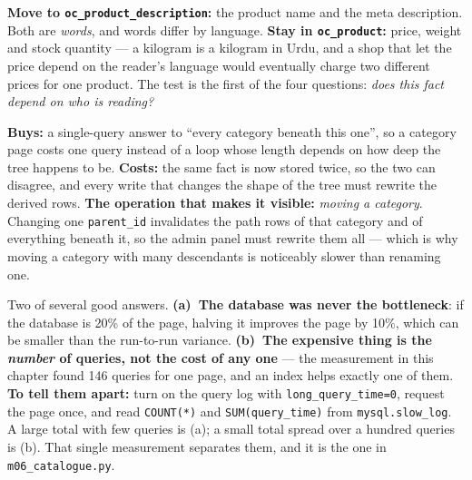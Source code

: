 \begin{ans}
  \item \textbf{Move to \texttt{oc\_product\_description}:} the product name
        and the meta description. Both are \emph{words}, and words differ by
        language. \textbf{Stay in \texttt{oc\_product}:} price, weight and
        stock quantity --- a kilogram is a kilogram in Urdu, and a shop that
        let the price depend on the reader's language would eventually charge
        two different prices for one product. The test is the first of the four
        questions: \emph{does this fact depend on who is reading?}
  \item \textbf{Buys:} a single-query answer to ``every category beneath this
        one'', so a category page costs one query instead of a loop whose
        length depends on how deep the tree happens to be.
        \textbf{Costs:} the same fact is now stored twice, so the two can
        disagree, and every write that changes the shape of the tree must
        rewrite the derived rows. \textbf{The operation that makes it visible:}
        \emph{moving a category}. Changing one \texttt{parent\_id} invalidates
        the path rows of that category and of everything beneath it, so the
        admin panel must rewrite them all --- which is why moving a category
        with many descendants is noticeably slower than renaming one.
  \item Two of several good answers. \textbf{(a)~The database was never the
        bottleneck}: if the database is 20\% of the page, halving it improves
        the page by 10\%, which can be smaller than the run-to-run variance.
        \textbf{(b)~The expensive thing is the \emph{number} of queries, not
        the cost of any one} --- the measurement in this chapter found 146
        queries for one page, and an index helps exactly one of them.
        \smallskip
        \textbf{To tell them apart:} turn on the query log with
        \texttt{long\_query\_time=0}, request the page once, and read
        \texttt{COUNT(*)} and \texttt{SUM(query\_time)} from
        \texttt{mysql.slow\_log}. A large total with few queries is (a); a
        small total spread over a hundred queries is (b). That single
        measurement separates them, and it is the one in
        \texttt{m06\_catalogue.py}.
\end{ans}

